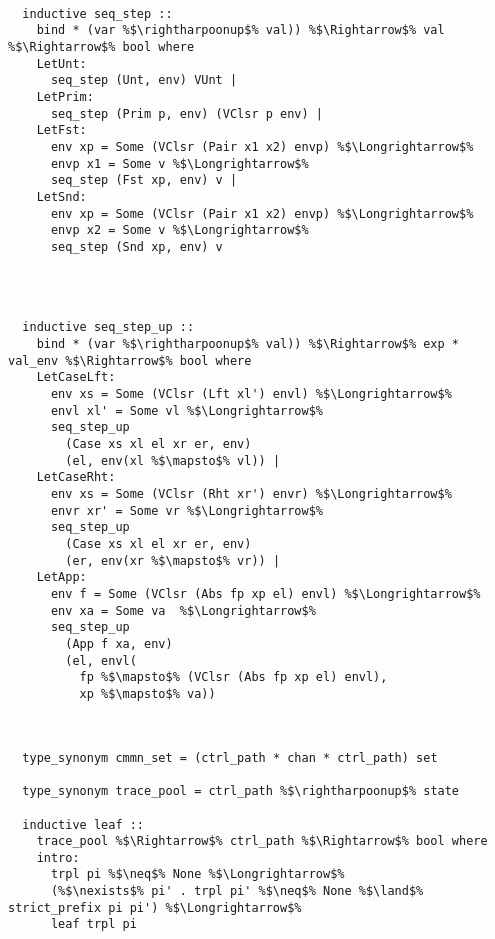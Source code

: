 \documentclass{article}
\begin{document}
\begin{lstlisting}[style=codestyle1, escapechar=\%]

  inductive seq_step ::
    bind * (var %$\rightharpoonup$% val)) %$\Rightarrow$% val %$\Rightarrow$% bool where
    LetUnt: 
      seq_step (Unt, env) VUnt |
    LetPrim:
      seq_step (Prim p, env) (VClsr p env) |
    LetFst:
      env xp = Some (VClsr (Pair x1 x2) envp) %$\Longrightarrow$%
      envp x1 = Some v %$\Longrightarrow$% 
      seq_step (Fst xp, env) v |
    LetSnd: 
      env xp = Some (VClsr (Pair x1 x2) envp) %$\Longrightarrow$%  
      envp x2 = Some v %$\Longrightarrow$% 
      seq_step (Snd xp, env) v


  \end{lstlisting}
\begin{lstlisting}[style=codestyle1, escapechar=\%]


  inductive seq_step_up ::
    bind * (var %$\rightharpoonup$% val)) %$\Rightarrow$% exp * val_env %$\Rightarrow$% bool where 
    LetCaseLft:
      env xs = Some (VClsr (Lft xl') envl) %$\Longrightarrow$%
      envl xl' = Some vl %$\Longrightarrow$%
      seq_step_up
        (Case xs xl el xr er, env)
        (el, env(xl %$\mapsto$% vl)) |
    LetCaseRht: 
      env xs = Some (VClsr (Rht xr') envr) %$\Longrightarrow$% 
      envr xr' = Some vr %$\Longrightarrow$%
      seq_step_up
        (Case xs xl el xr er, env)
        (er, env(xr %$\mapsto$% vr)) |
    LetApp:
      env f = Some (VClsr (Abs fp xp el) envl) %$\Longrightarrow$% 
      env xa = Some va  %$\Longrightarrow$% 
      seq_step_up
        (App f xa, env)
        (el, envl(
          fp %$\mapsto$% (VClsr (Abs fp xp el) envl),
          xp %$\mapsto$% va))

  \end{lstlisting}
\begin{lstlisting}[style=codestyle1, escapechar=\%]


  type_synonym cmmn_set = (ctrl_path * chan * ctrl_path) set

  type_synonym trace_pool = ctrl_path %$\rightharpoonup$% state

  inductive leaf ::
    trace_pool %$\Rightarrow$% ctrl_path %$\Rightarrow$% bool where
    intro:
      trpl pi %$\neq$% None %$\Longrightarrow$% 
      (%$\nexists$% pi' . trpl pi' %$\neq$% None %$\land$% strict_prefix pi pi') %$\Longrightarrow$%  
      leaf trpl pi

  \end{lstlisting}
\end{document}
